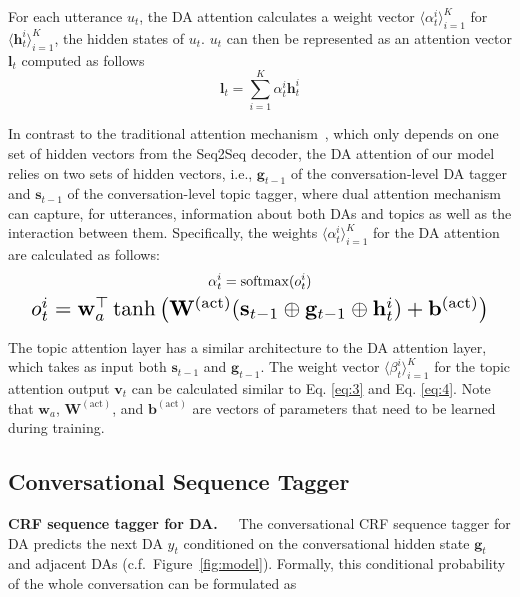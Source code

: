 \documentclass[11pt,a4paper]{article}
\begin{document}
For each utterance $u_t$, the DA attention calculates a weight vector $\langle \alpha_t^i\rangle_{i=1}^K$ for $\langle\mathbf{h}_t^i\rangle_{i=1}^K$, the hidden states of $u_t$. $u_t$ can then be represented as an attention vector $\mathbf{l}_t$ computed as follows 
\begin{equation} \label{eq:3}
\mathbf{l} _ { t } = \sum _ { i=1 }^{K} \alpha _ { t } ^ { i } \mathbf{h} _ { t } ^ { i }
\end{equation}

In contrast to the traditional attention mechanism~\cite{bahdanau2014neural}, which only depends on one set of hidden vectors from the Seq2Seq decoder, the DA attention of our model relies on two sets of hidden vectors, i.e., $\mathbf{g}_{t-1}$ of the conversation-level DA tagger and $\mathbf{s}_{t-1}$ of the conversation-level topic tagger, where dual attention mechanism can capture, for utterances, information about both DAs and topics as well as the interaction between them. Specifically, the weights $\langle \alpha_t^i\rangle_{i=1}^K$ for the DA attention are calculated as follows: 
\def\softmax{\mathop{\rm softmax}}
\begin{gather} \label{eq:4}
\alpha_t^i = \softmax (o_t^i)\\
\resizebox{0.95\hsize}{!}{$o _ { t } ^ { i } =\mathbf{w}^{\top}_a\tanh \left( \mathbf{W} ^ { ( \mathrm { act } ) } (\mathbf{s} _ { t-1 }  \oplus \mathbf { g } _ { t - 1 }  \oplus \mathbf{h}_{t}^{i}) + \mathbf { b } ^ { ( \mathrm { act } ) } \right)$}
\end{gather} 

The topic attention layer has a similar architecture to the DA attention layer, which takes as input both $\mathbf{s}_{t-1}$ and $\mathbf{g}_{t-1}$. 
The weight vector $\langle \beta_t ^i \rangle_{i=1} ^K$ for the  topic attention output $\mathbf{v}_t$ can be calculated similar to Eq. \ref{eq:3} and Eq. \ref{eq:4}.
Note that $\mathbf{w}_a$, 
$\mathbf{W} ^ { ( \mathrm{ act } )}$, 
and $\mathbf { b } ^ { ( \mathrm { act } ) }$
are vectors of parameters that  need to be learned during training. 

\subsection{Conversational Sequence Tagger}

\noindent\textbf{CRF sequence tagger for DA.}~~~The conversational CRF sequence tagger for DA predicts the next DA $y_t$ conditioned on the conversational hidden state $\mathbf{g}_t$ and adjacent DAs (c.f.~Figure~\ref{fig:model}). Formally, this conditional probability of the whole conversation can be formulated as
\end{document}
